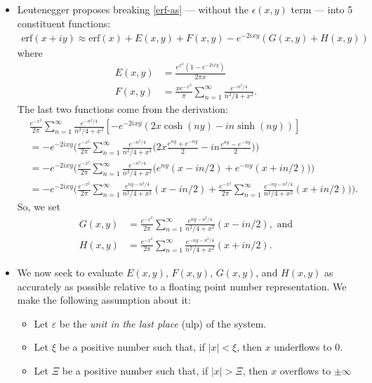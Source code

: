 \documentclass[10pt]{article}
\newcommand{\erf}{\mathrm{erf}}
\begin{document}
\begin{itemize}
    \item Leutenegger proposes breaking \eqref{erf-as} --- without the $\epsilon(x,y)$ term --- into 5 constituent functions:
    \begin{align*}
      \erf(x+iy) \approx \erf(x) + E(x,y) + F(x,y) - e^{-2ixy}(G(x,y) + H(x,y))
    \end{align*}
    where
    \begin{align*}
      E(x,y) &= \frac{e^{x^2}(1 - e^{-2ixy})}{2\pi x}\\
      F(x,y) &= \frac{x e^{-x^2}}{\pi} \sum_{n=1}^\infty \frac{e^{-n^2/4}}{n^2/4 + x^2}.
    \end{align*}
    The last two functions come from the derivation:
    \begin{align*}
      &\frac{e^{-x^2}}{2\pi}\sum_{n=1}^\infty \frac{e^{-n^2/4}}{n^2/4 + x^2} [-e^{-2ixy}(2x \cosh(ny) - in \sinh(ny))]\\
      &= -e^{-2ixy}\Bigg( \frac{e^{-x^2}}{2\pi} \sum_{n=1}^\infty \frac{e^{-n^2/4}}{n^2/4 + x^2} \bigg(2x \frac{e^{ny} + e^{-ny}}{2} - in \frac{e^{ny} - e^{-ny}}{2} \bigg)\Bigg)\\
      &= -e^{-2ixy}\Bigg( \frac{e^{-x^2}}{2\pi} \sum_{n=1}^\infty \frac{e^{-n^2/4}}{n^2/4 + x^2} \big(e^{ny} (x - in/2) + e^{-ny}(x + in/2) \big) \Bigg)\\
      &= -e^{-2ixy}\Bigg( \frac{e^{-x^2}}{2\pi} \sum_{n=1}^\infty \frac{e^{ny-n^2/4}}{n^2/4 + x^2} (x - in/2) + \frac{e^{-x^2}}{2\pi} \sum_{n=1}^\infty \frac{e^{-ny-n^2/4}}{n^2/4 + x^2}(x + in/2) \big) \Bigg).
    \end{align*}
    So, we set
    \begin{align*}
      G(x,y) &= \frac{e^{-x^2}}{2\pi} \sum_{n=1}^\infty \frac{e^{ny-n^2/4}}{n^2/4 + x^2} (x - in/2),\mbox{ and}\\
      H(x,y) &= \frac{e^{-x^2}}{2\pi} \sum_{n=1}^\infty \frac{e^{-ny-n^2/4}}{n^2/4 + x^2}(x + in/2).
    \end{align*}
        
    \item We now seek to evaluate $E(x,y)$, $F(x,y)$, $G(x,y)$, and $H(x,y)$ as accurately as possible relative to a floating point number representation. We make the following assumption about it:
    \begin{itemize}
      \item Let $\varepsilon$ be the \emph{unit in the last place} (ulp) of the system.
      \item Let $\xi$ be a positive number such that, if $|x| < \xi$, then $x$ underflows to 0.
      \item Let $\Xi$ be a positive number such that, if $|x| > \Xi$, then $x$ overflows to $\pm \infty$
    \end{itemize}
    

\end{itemize}
\end{document}
